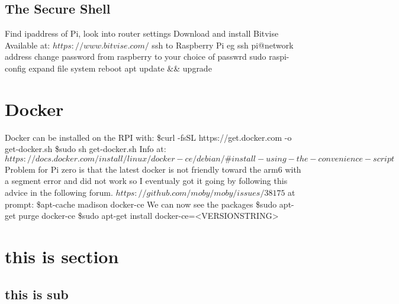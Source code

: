 \documentclass[a4paper,12pt]{article}
\begin{document}
\subsection{The Secure Shell}
Find ipaddress of Pi, look into router settings
\newline
Download and install Bitvise
Available at:
\newline
$https://www.bitvise.com/$
\newline
\newline
ssh to Raspberry Pi eg ssh pi@network address
\newline
change password from raspberry to your choice of passwrd
\newline
sudo raspi-config
\newline
expand file system
\newline
reboot
\newline\newline
apt update \&\& upgrade
\newline
\section{Docker}
Docker can be installed on the RPI with:
\newline\newline
\$curl -fsSL https://get.docker.com -o get-docker.sh
\newline
\$sudo sh get-docker.sh
\newline
Info at:
\newline
$https://docs.docker.com/install/linux/docker-ce/debian/\#install-using-the-convenience-script$
\newline\newline
Problem for Pi zero is that the latest docker is not friendly toward the arm6 with a segment error and did not work so I eventualy got it going by following this advice in the following forum.
\newline
\newline
$https://github.com/moby/moby/issues/38175$
\newline
\newline
at prompt:
\$apt-cache madison docker-ce
\newline
We can now see the packages
\newline
\$sudo apt-get purge docker-ce
\newline
\$sudo apt-get install docker-ce=<VERSION\textunderscore STRING>

\pagebreak
\section{this is section}
\subsection{this is sub}
\end{document}
